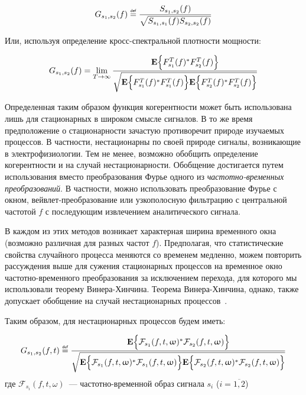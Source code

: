\begin{equation}
    G_{s_1,s_2}(f) \defeq \frac{S_{s_1,s_2}(f)}{\sqrt{S_{s_1,s_1}(f)S_{s_2,s_2}(f)}}
    \label{def_coh}
\end{equation}

Или, используя определение кросс-спектральной плотности мощности:

\begin{equation}
    G_{s_1,s_2}(f) = \lim_{T \to \infty}
    \frac{\mathbf{E}\Big\{F_{s_1}^T(f)^*F_{s_2}^T(f)\Big\}}
    {\sqrt{\mathbf{E}\Big\{F_{s_1}^T(f)^*F_{s_1}^T(f)\Big\}
    \mathbf{E}\Big\{F_{s_2}^T(f)^*F_{s_2}^T(f)\Big\}}}
\end{equation}

Определенная таким образом функция когерентности может быть использована лишь
для стационарных в широком смысле сигналов.  В то же время предположение о
стационарности зачастую противоречит природе изучаемых процессов. В частности,
нестационарны по своей природе сигналы, возникающие в электрофизиологии.  Тем
не менее, возможно обобщить определение когерентности и на случай
нестационарности.  Обобщение достигается путем использования вместо
преобразования Фурье одного из \emph{частотно-временных преобразований}.  В
частности, можно использовать преобразование Фурье с окном,
вейвлет-преобразование или узкополосную фильтрацию с центральной частотой $f$ с
последующим извлечением аналитического сигнала.

В каждом из этих методов возникает характерная ширина временного окна (возможно
различная для разных частот $f$).  Предполагая, что статистические свойства
случайного процесса меняются со временем медленно, можем повторить рассуждения
выше для сужения стационарных процессов на временное окно частотно-временного
преобразования за исключением перехода, для которого мы использовали теорему
Винера-Хинчина.  Теорема Винера-Хинчина, однако, также допускает обобщение на
случай нестационарных процессов~\cite{Lu2009}.

Таким образом, для нестационарных процессов будем иметь:

\begin{equation}
    G_{s_1,s_2}(f,t) \defeq
    \frac{\Expect{\conj{\mathcal{F}_{s_1}(f,t,\omega)}\mathcal{F}_{s_2}(f,t,\omega)}}
    {\sqrt{\Expect{\conj{\mathcal{F}_{s_1}(f,t,\omega)}\mathcal{F}_{s_1}(f,t,\omega)}
    \Expect{\conj{\mathcal{F}_{s_2}(f,t,\omega)}\mathcal{F}_{s_2}(f,t,\omega)}}}
    \label{nonwss_coh_def}
\end{equation}
где $\mathcal{F}_{s_i}(f,t,\omega)$~--- частотно-временной образ сигнала $s_i$ ($i=\overline{1,2}$)

